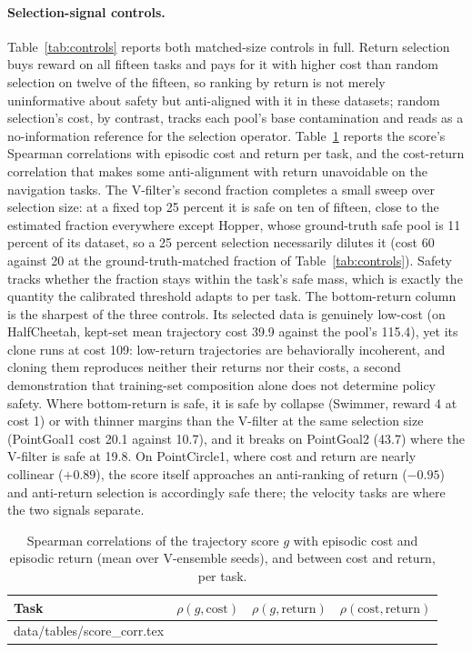 \documentclass{article} %
\makeatletter
\newcommand{\tabinput}[1]{\@@input#1 }
\makeatother
\begin{document}
\paragraph{Selection-signal controls.} Table~\ref{tab:controls} reports both matched-size controls in full. Return selection buys reward on all fifteen tasks and pays for it with higher cost than random selection on twelve
of the fifteen, so ranking by return is not merely uninformative about safety but anti-aligned with it in these datasets; random selection's cost, by contrast, tracks each pool's base contamination and reads as a no-information reference for the selection operator. Table~\ref{tab:scorecorr} reports the score's Spearman correlations with episodic cost and return per task, and the cost-return correlation that makes some anti-alignment with return unavoidable on the navigation tasks. The V-filter's second fraction completes a small sweep over selection size: at a fixed top 25 percent it is safe on ten of fifteen, close to the estimated fraction everywhere except Hopper, whose ground-truth safe pool is 11 percent of its dataset, so a 25 percent selection necessarily dilutes it (cost 60 against 20 at the ground-truth-matched fraction of Table~\ref{tab:controls}). Safety tracks whether the fraction stays within the task's safe mass, which is exactly the quantity the calibrated threshold adapts to per task. The bottom-return column is the sharpest of the three controls. Its selected data is genuinely low-cost (on HalfCheetah, kept-set mean trajectory cost 39.9 against the pool's 115.4), yet its clone runs at cost 109: low-return trajectories are behaviorally incoherent, and cloning them reproduces neither their returns nor their costs, a second demonstration that training-set composition alone does not determine policy safety. Where bottom-return is safe, it is safe by collapse (Swimmer, reward 4 at cost 1) or with thinner margins than the V-filter at the same selection size (PointGoal1 cost 20.1 against 10.7), and it breaks on PointGoal2 (43.7) where the V-filter is safe at 19.8. On PointCircle1, where cost and return are nearly collinear ($+0.89$), the score itself approaches an anti-ranking of return ($-0.95$) and anti-return selection is accordingly safe there; the velocity tasks are where the two signals separate.

\begin{table}[h]
\caption{Spearman correlations of the trajectory score $g$ with episodic cost and episodic return (mean over V-ensemble seeds), and between cost and return, per task.}
\label{tab:scorecorr}
\begin{center}
\small
\begin{tabular}{l rrr}
\toprule
Task & $\rho(g, \text{cost})$ & $\rho(g, \text{return})$ & $\rho(\text{cost}, \text{return})$ \\
\midrule
\tabinput{data/tables/score_corr.tex}
\bottomrule
\end{tabular}
\end{center}
\end{table}
\end{document}
